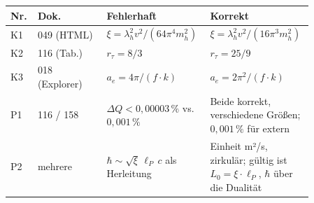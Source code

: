 \begin{center}
\begin{tabular}{p{0.08\linewidth}p{0.22\linewidth}p{0.28\linewidth}p{0.28\linewidth}}
\hline
\textbf{Nr.} & \textbf{Dok.} & \textbf{Fehlerhaft} & \textbf{Korrekt} \\
\hline
K1 & 049 (HTML) & $\xi = \lambda_h^2 v^2/(64\pi^4 m_h^2)$ &
     $\xi = \lambda_h^2 v^2/(16\pi^3 m_h^2)$ \\[4pt]
K2 & 116 (Tab.) & $r_\tau = 8/3$ &
     $r_\tau = 25/9$ \\[4pt]
K3 & 018 (Explorer) & $a_e = 4\pi/(f\cdot k)$ &
     $a_e = 2\pi^2/(f\cdot k)$ \\[4pt]
P1 & 116 / 158 & $\Delta Q < 0{,}00003\,\%$ vs.\ $0{,}001\,\%$ &
     Beide korrekt, verschiedene Größen; $0{,}001\,\%$ für extern \\[4pt]
P2 & mehrere & $\hbar \sim \sqrt{\xi}\,\ell_P\,c$ als Herleitung &
     Einheit m²/s, zirkulär; gültig ist $L_0 = \xi\cdot\ell_P$, $\hbar$ über die Dualität \\
\hline
\end{tabular}
\end{center}
